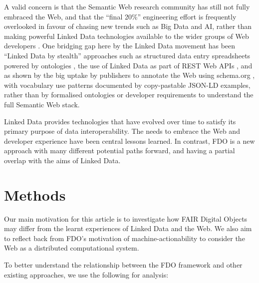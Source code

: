 \documentclass[fleqn,10pt,lineno]{wlpeerjlua}
\begin{document}
A valid concern is that the Semantic Web research community has still not fully embraced the Web, and that the ``final 20\%'' engineering effort is frequently overlooked in favour of chasing new trends such as Big Data and AI, rather than making powerful Linked Data technologies available to the wider groups of Web developers \autocite{verborghSemanticWebIdentity2020a}. One bridging gap here by the Linked Data movement has been ``Linked Data by stealth'' approaches such as structured data entry spreadsheets powered by ontologies \autocite{wolstencroftRightFieldEmbeddingOntology2011b}, the use of Linked Data as part of REST Web APIs \autocite{pageRESTLinkedData2011}, and as shown by the big uptake by publishers to annotate the Web using schema.org \autocite{bernsteinNewLookSemantic2016a}, with vocabulary use patterns documented by copy-pastable JSON-LD examples, rather than by formalised ontologies or developer requirements to understand the full Semantic Web stack.

Linked Data provides technologies that have evolved over time to satisfy its primary purpose of data interoperability. The needs to embrace the Web and developer experience have been central lessons learned.  In contrast, FDO is a new approach with many different potential paths forward, and having a partial overlap with the aims of Linked Data.



\section*{Methods}\label{sec:methods}

Our main motivation for this article is to investigate how FAIR Digital Objects may differ from the learnt experiences of Linked Data and the Web. We also aim to reflect back from FDO's motivation of machine-actionability to consider the Web as a distributed computational system.

To better understand the relationship between the FDO framework and other existing approaches, we use the following for analysis:
\end{document}
